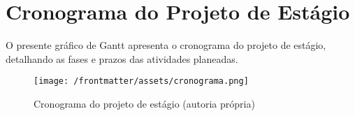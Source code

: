 \chapter{Cronograma do Projeto de Estágio}
\label{AppendixA}

O presente gráfico de Gantt apresenta o cronograma do projeto de estágio, detalhando as fases e prazos das atividades planeadas.

\begin{figure}[h]
    \centering
    \texttt{[image: /frontmatter/assets/cronograma.png]}
    \caption{Cronograma do projeto de estágio (autoria própria)}
    \label{fig:cronograma}
\end{figure}
